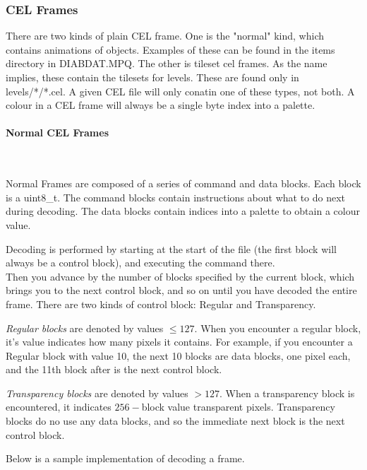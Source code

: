\documentclass[a4paper]{article}
\newcommand{\subsubsubsection}[1] 
{
	\paragraph{#1}
	\mbox{}\\
	
	\noindent
}
\begin{document}
	\subsubsection{CEL Frames}
	There are two kinds of plain CEL frame. One is the "normal" kind, which contains animations of objects. Examples of these can be found in the items directory in DIABDAT.MPQ. The other is tileset cel frames. As the name implies, these contain the tilesets for levels. These are found only in levels/*/*.cel.
	A given CEL file will only conatin one of these types, not both.
A colour in a CEL frame will always be a single byte index into a palette.

	\subsubsubsection{Normal CEL Frames}
	Normal Frames are composed of a series of command and data blocks.
	Each block is a uint8\_t.
	The command blocks contain instructions about what to do next during decoding. The data blocks contain indices into a palette to obtain a colour value.
	
	Decoding is performed by starting at the start of the file (the first block will always be a control block), and executing the command there. 
	\\Then you advance by the number of blocks specified by the current block, which brings you to the next control block, and so on until you have decoded the entire frame. There are two kinds of control block: Regular and Transparency.
	
	\emph{Regular blocks} are denoted by values $\leq 127$. When you encounter a regular block, it's value indicates how many pixels it contains. For example, if you encounter a Regular block with value 10, the next 10 blocks are data blocks, one pixel each, and the 11th block after is the next control block.
	
	\emph{Transparency blocks} are denoted by values $> 127$. When a transparency block is encountered, it indicates $256-$block value transparent pixels. Transparency blocks do no use any data blocks, and so the immediate next block is the next control block.
	
	Below is a sample implementation of decoding a frame.
	
\end{document}
